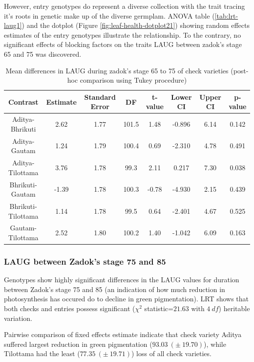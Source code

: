 \documentclass[12pt,oneside]{dukestatscithesis} %
\theoremstyle{definition}
\theoremstyle{definition}
\theoremstyle{definition}
\theoremstyle{remark}
\begin{document}
However, entry genotypes do represent a diverse collection with the
trait tracing it's roots in genetic make up of the diverse germplam.
ANOVA table (\ref{tab:lrt-laug1}) and the dotplot (Figure
\ref{fig:leaf-health-dotplot21}) showing random effects estimates of the
entry genotypes illustrate the relationship. To the contrary, no
significant effects of blocking factors on the traits LAUG between
zadok's stage 65 and 75 was discovered.
\begin{table}[H]

\caption{\label{tab:leaf-health-meanconf-tab5}Mean differences in LAUG during zadok's stage 65 to 75 of check varieties (post-hoc comparison using Tukey procedure)}
\centering
\begin{tabular}[t]{cccccccc}
\toprule
Contrast & Estimate & Standard Error & DF & t-value & Lower CI & Upper CI & p-value\\
\midrule
Aditya-Bhrikuti & 2.62 & 1.77 & 101.5 & 1.48 & -0.896 & 6.14 & 0.142\\
Aditya-Gautam & 1.24 & 1.79 & 100.4 & 0.69 & -2.310 & 4.78 & 0.491\\
Aditya-Tilottama & 3.76 & 1.78 & 99.3 & 2.11 & 0.217 & 7.30 & 0.038\\
Bhrikuti-Gautam & -1.39 & 1.78 & 100.3 & -0.78 & -4.930 & 2.15 & 0.439\\
Bhrikuti-Tilottama & 1.14 & 1.78 & 99.5 & 0.64 & -2.401 & 4.67 & 0.525\\
Gautam-Tilottama & 2.52 & 1.80 & 100.2 & 1.40 & -1.042 & 6.09 & 0.163\\
\bottomrule
\end{tabular}
\end{table}
\subsubsection{LAUG between Zadok's stage 75 and
85}\label{laug-between-zadoks-stage-75-and-85}

Genotypes show highly significant differences in the LAUG values for
duration between Zadok's stage 75 and 85 (an indication of how much
reduction in photosynthesis has occured do to decline in green
pigmentation). LRT shows that both checks and entries possess
significant (\(\chi^2\) statistic=\(21.63\) with \(4\ df\)) heritable
variation.

Pairwise comparison of fixed effects estimate indicate that check
variety Aditya suffered largest reduction in green pigmentation
(\(93.03\ (\pm\ 19.70)\)), while Tilottama had the least
(\(77.35\ (\pm\ 19.71)\)) loss of all check varieties.
\end{document}
